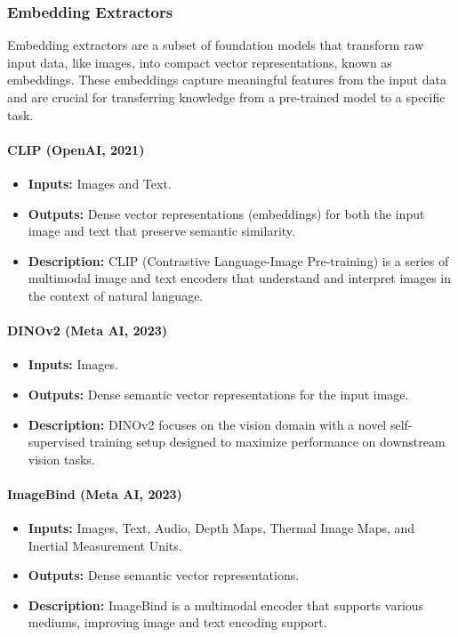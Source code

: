 \documentclass[12pt]{article}
\begin{document}
\subsubsection{Embedding Extractors}

Embedding extractors are a subset of foundation models that transform raw input data, like images, into compact vector representations, known as embeddings. These embeddings capture meaningful features from the input data and are crucial for transferring knowledge from a pre-trained model to a specific task.

\paragraph{CLIP (OpenAI, 2021)}

\begin{itemize}
    \item \textbf{Inputs:} Images and Text.
    \item \textbf{Outputs:} Dense vector representations (embeddings) for both the input image and text that preserve semantic similarity.
    \item \textbf{Description:} CLIP (Contrastive Language-Image Pre-training) is a series of multimodal image and text encoders that understand and interpret images in the context of natural language.
\end{itemize}

\paragraph{DINOv2 (Meta AI, 2023)}

\begin{itemize}
    \item \textbf{Inputs:} Images.
    \item \textbf{Outputs:} Dense semantic vector representations for the input image.
    \item \textbf{Description:} DINOv2 focuses on the vision domain with a novel self-supervised training setup designed to maximize performance on downstream vision tasks.
\end{itemize}

\paragraph{ImageBind (Meta AI, 2023)}

\begin{itemize}
    \item \textbf{Inputs:} Images, Text, Audio, Depth Maps, Thermal Image Maps, and Inertial Measurement Units.
    \item \textbf{Outputs:} Dense semantic vector representations.
    \item \textbf{Description:} ImageBind is a multimodal encoder that supports various mediums, improving image and text encoding support.
\end{itemize}
\end{document}
